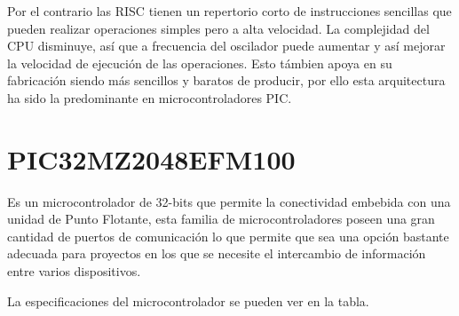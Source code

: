 \documentclass[letterpaper,12pt,oneside]{book}
\begin{document}
			Por el contrario las RISC tienen un repertorio corto de instrucciones sencillas que pueden realizar operaciones simples pero a alta velocidad. La complejidad del CPU disminuye, así que a frecuencia del oscilador puede aumentar y así mejorar la velocidad de ejecución de las operaciones. Esto támbien apoya en su fabricación siendo más sencillos y baratos de producir, por ello esta arquitectura ha sido la predominante en microcontroladores PIC.

		\section{PIC32MZ2048EFM100}
		Es un microcontrolador de 32-bits que permite la conectividad embebida con una unidad de Punto Flotante\cite{PIC32MZ}, esta familia de microcontroladores poseen una gran cantidad de puertos de comunicación lo que permite que sea una opción bastante adecuada para proyectos en los que se necesite el intercambio de información entre varios dispositivos.

		La especificaciones del microcontrolador se pueden ver en la tabla.
\end{document}
